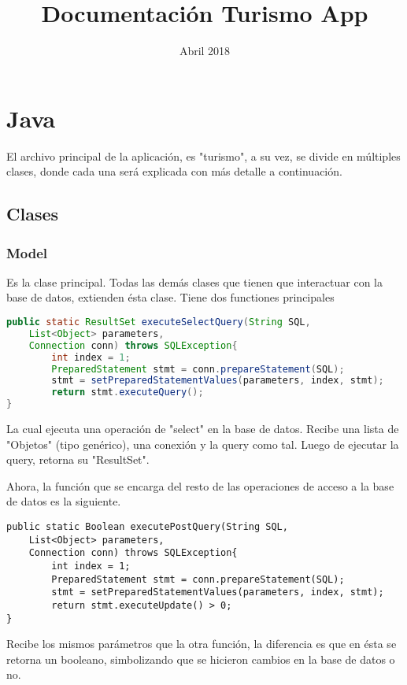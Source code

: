 \documentclass{article}
\title{Documentación Turismo App}
\date{Abril 2018}
\begin{document}
\maketitle
\newpage
\tableofcontents
\newpage

\section{Java}
El archivo principal de la aplicación, es "turismo", a su vez, se divide en múltiples clases, donde cada una será explicada con más detalle a continuación.

\subsection{Clases}
    \subsubsection{Model}
        Es la clase principal. Todas las demás clases que tienen que interactuar con la base de datos, extienden ésta clase. Tiene dos functiones principales
        \begin{lstlisting}[language=Java]
public static ResultSet executeSelectQuery(String SQL,
    List<Object> parameters,
    Connection conn) throws SQLException{
        int index = 1;
        PreparedStatement stmt = conn.prepareStatement(SQL);
        stmt = setPreparedStatementValues(parameters, index, stmt);
        return stmt.executeQuery();
}
        \end{lstlisting}
        La cual ejecuta una operación de "select" en la base de datos. Recibe una lista de "Objetos" (tipo genérico), una conexión y la query como tal.
        Luego de ejecutar la query, retorna su "ResultSet".
        
        Ahora, la función que se encarga del resto de las operaciones de acceso a la base de datos es la siguiente.
        \begin{lstlisting}
public static Boolean executePostQuery(String SQL,
    List<Object> parameters,
    Connection conn) throws SQLException{
        int index = 1;
        PreparedStatement stmt = conn.prepareStatement(SQL);
        stmt = setPreparedStatementValues(parameters, index, stmt);
        return stmt.executeUpdate() > 0;
}
        \end{lstlisting}
        Recibe los mismos parámetros que la otra función, la diferencia es que en ésta se retorna un booleano, simbolizando que se hicieron cambios en la base de datos o no.
        
\end{document}
